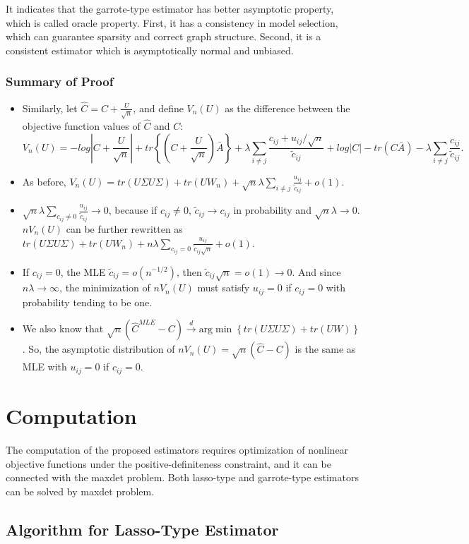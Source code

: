 \documentclass[11pt]{article} %
\begin{document}
It indicates that the garrote-type estimator has better asymptotic property, which is called oracle property. First, it has a consistency in model selection, which can guarantee sparsity and correct graph structure. Second, it is a consistent estimator which is asymptotically normal and unbiased. 
\subsubsection{Summary of Proof}
\begin{itemize}
\item Similarly, let $\hat{C}=C+\frac{U}{\sqrt{n}}$, and define $V_n(U)$ as the difference between the objective function values of $\hat{C}$ and $C$: 
\[V_n(U)=-log\left\vert C+\frac{U}{\sqrt{n}}\right\vert +tr\left\lbrace \left( C+\frac{U}{\sqrt{n}}\right) \bar{A}\right\rbrace +\lambda \sum_{i\neq j} \frac{c_{ij}+u_{ij}/\sqrt{n}}{\tilde{c}_{ij}} +log|C|-tr(C\bar{A})-\lambda \sum_{i\neq j}\frac{c_{ij}}{\tilde{c}_{ij}} \mbox{.}\]
\item As before, $V_n(U)=tr(U\Sigma U\Sigma )+tr(UW_n)+\sqrt{n} \lambda \sum_{i\neq j}\frac{u_{ij}}{\tilde{c}_{ij}} +o(1)$.
\item $\sqrt{n} \lambda \sum_{c_{ij}\neq 0}\frac{u_{ij}}{\tilde{c}_{ij}} \rightarrow 0$, because if $c_{ij}\neq 0$, $\tilde{c}_{ij} \rightarrow c_{ij}$ in probability and $\sqrt{n} \lambda \rightarrow 0$. $nV_n(U)$ can be further rewritten as $tr(U\Sigma U\Sigma )+tr(UW_n)+n\lambda \sum_{c_{ij}=0}\frac{u_{ij}}{\tilde{c}_{ij} \sqrt{n}} +o(1)$. 
\item If $c_{ij}=0$, the MLE $\tilde{c}_{ij}=o(n^{-1/2})$, then $\tilde{c}_{ij} \sqrt{n}=o(1)\rightarrow 0$. And since $n\lambda \rightarrow \infty$, the minimization of $nV_n(U)$ must satisfy $u_{ij}=0$ if $c_{ij}=0$ with probability tending to be one. 
\item We also know that $\sqrt{n} \left( \hat{C}^{MLE} - C\right) \stackrel{d}{\rightarrow} \mbox{arg} \min \left\lbrace tr(U\Sigma U\Sigma)+tr(UW)\right\rbrace$. So, the asymptotic distribution of $nV_n(U)=\sqrt{n} \left( \hat{C} - C\right)$ is the same as MLE with $u_{ij}=0$ if $c_{ij}=0$.
\end{itemize}

\section{Computation}
The computation of the proposed estimators requires optimization of nonlinear objective functions under the positive-definiteness constraint, and it can be connected with the maxdet problem. Both lasso-type and garrote-type estimators can be solved by maxdet problem. 


\subsection{Algorithm for Lasso-Type Estimator}
\end{document}
